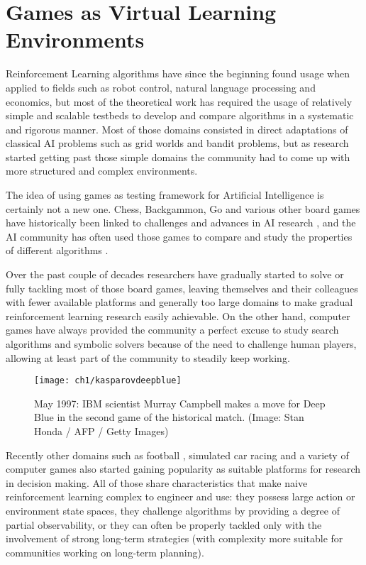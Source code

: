 \section{Games as Virtual Learning Environments}

Reinforcement Learning algorithms have since the beginning found usage when
applied to fields such as robot control, natural language processing and
economics, but most of the theoretical work has required the usage of relatively
simple and scalable testbeds to develop and compare algorithms in a systematic
and rigorous manner. Most of those domains consisted in direct adaptations of
classical AI problems such as grid worlds and bandit problems, but as research
started getting past those simple domains the community had to come up with more
structured and complex environments. 

The idea of using games as testing framework for Artificial Intelligence is
certainly not a new one. Chess, Backgammon, Go and various other board games
have historically been linked to challenges and advances in AI research
\citep{minsky1961steps}, and the AI community has often used those games to
compare and study the properties of different algorithms
\citep{silver2009reinforcement, tesauro1995temporal, campbell2002deep}.

Over the past couple of decades researchers have gradually started to solve or
fully tackling most of those board games, leaving themselves and their
colleagues with fewer available platforms and generally too large domains to
make gradual reinforcement learning research easily achievable. On the other
hand, computer games have always provided the community a perfect excuse to
study search algorithms and symbolic solvers because of the need to challenge
human players, allowing at least part of the community to steadily keep working.

\begin{figure}[h]
    \centering
    \texttt{[image: ch1/kasparovdeepblue]}
    \caption{May 1997: IBM scientist Murray Campbell makes a move for Deep Blue
      in the second game of the historical match. (Image: Stan Honda / AFP /
      Getty Images)}
    \label{fig:kasparovdeepblue}
\end{figure}

Recently other domains such as football \citep{kitano1997robocup}, simulated car
racing \citep{wymann2013torcs} and a variety of computer games also started
gaining popularity as suitable platforms for research in decision making. All of
those share characteristics that make naive reinforcement learning complex to
engineer and use: they possess large action or environment state spaces, they
challenge algorithms by providing a degree of partial observability, or they can
often be properly tackled only with the involvement of strong long-term
strategies (with complexity more suitable for communities working on long-term
planning).

